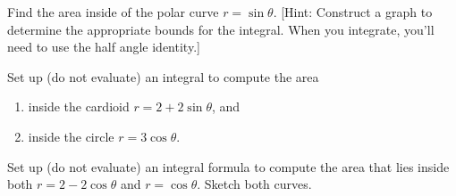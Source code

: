 {\begin{problem} 
Find the area inside of the polar curve $r=\sin\theta$. [Hint: Construct a graph to determine the appropriate bounds for the integral. When you integrate, you'll need to use the half angle identity.] 
\end{problem}


\begin{problem}
Set up (do not evaluate) an integral to compute the area 
\begin{enumerate}
\item inside the cardioid $r=2+2\sin\theta$, and 
\item inside the circle $r=3\cos\theta$.
\end{enumerate}
\end{problem}

\begin{problem}
Set up (do not evaluate) an integral formula to compute the area that lies inside both $r=2-2\cos\theta$ and $r=\cos\theta$. Sketch both curves. 
\end{problem}
}


